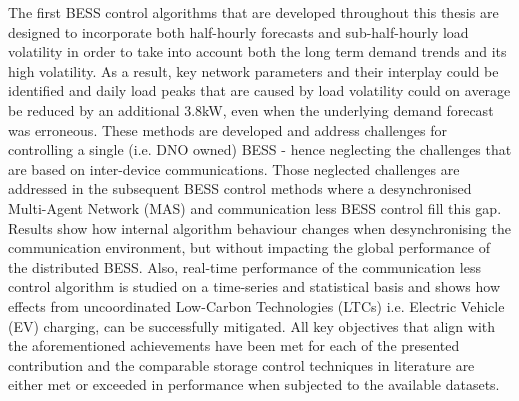 
The first BESS control algorithms that are developed throughout this thesis are designed to incorporate both half-hourly forecasts and sub-half-hourly load volatility in order to take into account both the long term demand trends and its high volatility.
As a result, key network parameters and their interplay could be identified and daily load peaks that are caused by load volatility could on average be reduced by an additional 3.8kW, even when the underlying demand forecast was erroneous.
These methods are developed and address challenges for controlling a single (i.e. DNO owned) BESS - hence neglecting the challenges that are based on inter-device communications.
Those neglected challenges are addressed in the subsequent BESS control methods where a desynchronised Multi-Agent Network (MAS) and communication less BESS control fill this gap.
Results show how internal algorithm behaviour changes when desynchronising the communication environment, but without impacting the global performance of the distributed BESS.
Also, real-time performance of the communication less control algorithm is studied on a time-series and statistical basis and shows how effects from uncoordinated Low-Carbon Technologies (LTCs) i.e. Electric Vehicle (EV) charging, can be successfully mitigated.
All key objectives that align with the aforementioned achievements have been met for each of the presented contribution and the comparable storage control techniques in literature are either met or exceeded in performance when subjected to the available datasets.
 